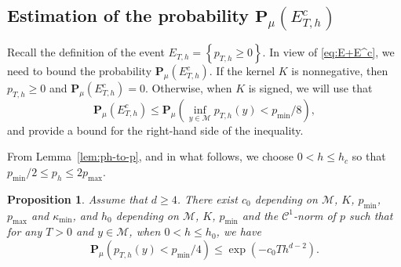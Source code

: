 \documentclass[10pt,a4paper]{article}
\renewcommand{\P}{{\mathbf P}}
\newcommand\cC{\mathcal{C}}
\newcommand\cM{\mathcal{M}}
\newcommand{\BRA}[1]{{{\left\{#1\right\}}}} %
\newcommand{\PAR}[1]{{{\left(#1\right)}}} %
\newtheorem{proposition}[theorem]{Proposition}
\begin{document}
	\subsection{Estimation of the probability $\P_\mu(E_{T,h}^c)$}\label{sec:Proba}

Recall the definition of the event $E_{T,h}=\BRA{ p_{T,h}\ge 0 }$. In view of \eqref{eq:E+E^c}, we need to bound the probability $\P_\mu(E_{T,h}^c)$.
If the kernel $K$ is nonnegative, then $p_{T,h}\ge 0$ and $\P_\mu(E_{T,h}^c)=0$. Otherwise, when $K$ is signed, we will use that
\begin{equation}\label{eq:control-P(E^c)}
\P_\mu(E_{T,h}^c) \le  \P_{\mu}\PAR{\inf_{y\in \cM}p_{T,h}(y)<p_{\min}/8 },
\end{equation}
and provide a bound for the right-hand side of the inequality. 

From Lemma~\ref{lem:ph-to-p}, and in what follows, we 
choose $0<h\le h_c$ so that $ p_{\min}/2\le p_h\le 2p_{\max}$.

	\begin{proposition}\label{prop:bernstein} 
		Assume that $d\ge 4$. There exist $c_0 $ depending on $\cM$, $K$, $p_{\min}$, $p_{\max}$ and $\kappa_{\min}$, and $h_0$ depending on $\cM$, $K$, $p_{\min}$ and the $\cC^1$-norm of $p$ such that  for any $T>0$ and $y \in \cM$, when $0<h\le h_0$, we have
		$$\P_{\mu}\PAR{ p_{T,h}(y) <p_{\min}/4} \le \exp\PAR{- c_0 T h^{d-2} }.$$
	\end{proposition}
	
\end{document}
